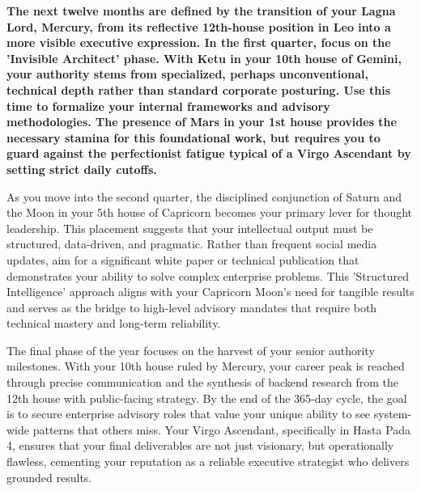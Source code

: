 \label{topic70}

{\fontsize{9.5}{13.8}\selectfont\bfseries\color{DeepSlate} The next twelve months are defined by the transition of your Lagna Lord, Mercury, from its reflective 12th-house position in Leo into a more visible executive expression. In the first quarter, focus on the 'Invisible Architect' phase. With Ketu in your 10th house of Gemini, your authority stems from specialized, perhaps unconventional, technical depth rather than standard corporate posturing. Use this time to formalize your internal frameworks and advisory methodologies. The presence of Mars in your 1st house provides the necessary stamina for this foundational work, but requires you to guard against the perfectionist fatigue typical of a Virgo Ascendant by setting strict daily cutoffs.}\par\vspace{2mm}

{\fontsize{9}{13}\selectfont As you move into the second quarter, the disciplined conjunction of Saturn and the Moon in your 5th house of Capricorn becomes your primary lever for thought leadership. This placement suggests that your intellectual output must be structured, data-driven, and pragmatic. Rather than frequent social media updates, aim for a significant white paper or technical publication that demonstrates your ability to solve complex enterprise problems. This 'Structured Intelligence' approach aligns with your Capricorn Moon's need for tangible results and serves as the bridge to high-level advisory mandates that require both technical mastery and long-term reliability.}\par\vspace{1.8mm}

{\fontsize{9}{13}\selectfont The final phase of the year focuses on the harvest of your senior authority milestones. With your 10th house ruled by Mercury, your career peak is reached through precise communication and the synthesis of backend research from the 12th house with public-facing strategy. By the end of the 365-day cycle, the goal is to secure enterprise advisory roles that value your unique ability to see system-wide patterns that others miss. Your Virgo Ascendant, specifically in Hasta Pada 4, ensures that your final deliverables are not just visionary, but operationally flawless, cementing your reputation as a reliable executive strategist who delivers grounded results.}\par\vspace{1.8mm}

